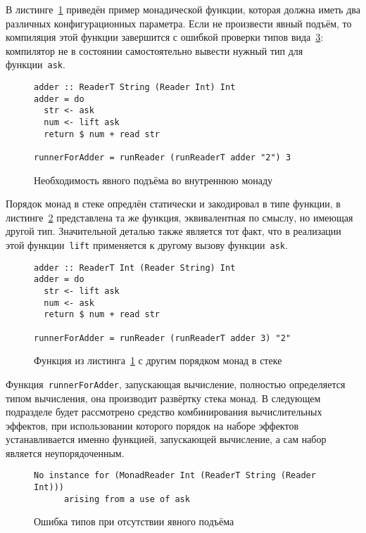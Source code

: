В листинге~\ref{listing:mtlReadersLift} приведён пример монадической функции, которая должна иметь два различных конфигурационных параметра. Если не произвести явный подъём, то компиляция этой функции завершится с ошибкой проверки типов вида~\ref{listing:mtlCompileError}: компилятор не в состоянии самостоятельно вывести нужный тип для функции~\lstinline{ask}.

\begin{figure}[t]
\begin{lstlisting}
adder :: ReaderT String (Reader Int) Int
adder = do
  str <- ask
  num <- lift ask
  return $ num + read str

runnerForAdder = runReader (runReaderT adder "2") 3
\end{lstlisting}
\caption{Необходимость явного подъёма во внутреннюю монаду}
\label{listing:mtlReadersLift}
\end{figure}

Порядок монад в стеке опредлён статически и закодировал в типе функции, в листинге~\ref{listing:mtlDifferentReadersLift} представлена та же функция, эквивалентная по смыслу, но имеющая другой тип. Значительной деталью также является тот факт, что в реализации этой функции~\lstinline{lift} применяется к другому вызову функции~\lstinline{ask}. 

\begin{figure}[t]
\begin{lstlisting}
adder :: ReaderT Int (Reader String) Int
adder = do
  str <- lift ask
  num <- ask
  return $ num + read str

runnerForAdder = runReader (runReaderT adder 3) "2"
\end{lstlisting}
\caption{Функция из листинга~\ref{listing:mtlReadersLift} с другим порядком монад в стеке}
\label{listing:mtlDifferentReadersLift}
\end{figure}

Функция~\lstinline{runnerForAdder}, запускающая вычисление, полностью определяется типом вычисления, она производит развёртку стека монад. В следующем подразделе будет рассмотрено средство комбинирования вычислительных эффектов, при использовании которого порядок на наборе эффектов устанавливается именно функцией, запускающей вычисление, а сам набор является неупорядоченным.     



\begin{figure}[t]
\begin{lstlisting}
No instance for (MonadReader Int (ReaderT String (Reader Int)))
      arising from a use of ask
\end{lstlisting}
\caption{Ошибка типов при отсутствии явного подъёма}
\label{listing:mtlCompileError}
\end{figure}

